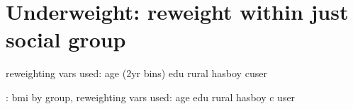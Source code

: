 \documentclass{article}
\begin{document}



\newpage 
\section{Underweight: reweight within \textbf{just social group} }

reweighting vars used: age (2yr bins) edu rural hasboy cuser

\begin{table}[H]
    \centering
    \footnotesize %
    \caption{: bmi by group, reweighting vars used: age edu rural hasboy c user}
    \label{tab:sumstat}
\end{table}






\end{document}
